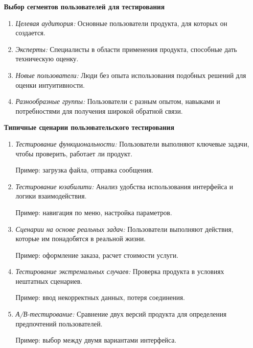 \textbf{Выбор сегментов пользователей для тестирования}

\begin{enumerate}
    \item \textit{Целевая аудитория:} Основные пользователи продукта, для которых он создается.
    \item \textit{Эксперты:} Специалисты в области применения продукта, способные дать техническую оценку.
    \item \textit{Новые пользователи:} Люди без опыта использования подобных решений для оценки интуитивности.
    \item \textit{Разнообразные группы:} Пользователи с разным опытом, навыками и потребностями для получения широкой обратной связи.
\end{enumerate}

\textbf{Типичные сценарии пользовательского тестирования}

\begin{enumerate}
    \item \textit{Тестирование функциональности:} Пользователи выполняют ключевые задачи, чтобы проверить, работает ли продукт.
    
        Пример: загрузка файла, отправка сообщения.

    \item \textit{Тестирование юзабилити:} Анализ удобства использования интерфейса и логики взаимодействия.

        Пример: навигация по меню, настройка параметров.

    \item \textit{Сценарии на основе реальных задач:} Пользователи выполняют действия, которые им понадобятся в реальной жизни.

        Пример: оформление заказа, расчет стоимости услуги.

    \item \textit{Тестирование экстремальных случаев:} Проверка продукта в условиях нештатных сценариев.

        Пример: ввод некорректных данных, потеря соединения.

    \item \textit{А/В-тестирование:} Сравнение двух версий продукта для определения предпочтений пользователей.

        Пример: выбор между двумя вариантами интерфейса.
\end{enumerate}

\pagebreak


